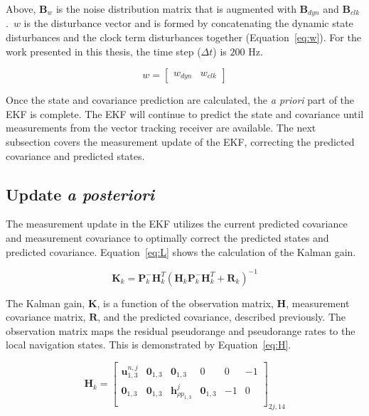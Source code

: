 Above, \(\mathbf{B}_w\) is the noise distribution matrix that is augmented with \(\mathbf{B}_{dyn}\) and \(\mathbf{B}_{clk}\).~\(w\) is the disturbance vector and is formed by concatenating the dynamic state disturbances and the clock term disturbances together (Equation~\ref{eq:w}). For the work presented in this thesis, the time step (\(\Delta t\)) is \(200\) Hz.

\begin{equation}\label{eq:w}
    w = \begin{bmatrix}
        w_{dyn} & w_{clk}
    \end{bmatrix}
\end{equation}

Once the state and covariance prediction are calculated, the \textit{a priori} part of the EKF is complete. The EKF will continue to predict the state and covariance until measurements from the vector tracking receiver are available. The next subsection covers the measurement update of the EKF, correcting the predicted covariance and predicted states.

\subsection{Update \textit{a posteriori}}
The measurement update in the EKF utilizes the current predicted covariance and measurement covariance to optimally correct the predicted states and predicted covariance. Equation~\ref{eq:L} shows the calculation of the Kalman gain.

\begin{equation}\label{eq:L}
    \mathbf{K}_k = \mathbf{P}^-_k \mathbf{H}^T_k{\left(\mathbf{H}_k\mathbf{P}^-_k\mathbf{H}^T_k + \mathbf{R}_k\right)}^{-1}
\end{equation}

The Kalman gain, \(\mathbf{K}\), is a function of the observation matrix, \(\mathbf{H}\), measurement covariance matrix, \(\mathbf{R}\), and the predicted covariance, described previously. The observation matrix maps the residual pseudorange and pseudorange rates to the local navigation states. This is demonstrated by Equation~\ref{eq:H}.

\begin{equation}\label{eq:H}
    \mathbf{H}_k = \begin{bmatrix}
        \mathbf{u}^{n,j}_{1,3} & \mathbf{0}_{1,3} & \mathbf{0}_{1,3}            & 0                & 0  & -1 \\
        \mathbf{0}_{1,3}       & \mathbf{0}_{1,3} & \mathbf{h}^j_{\rho p_{1,3}} & \mathbf{0}_{1,3} & -1 & 0  \\
    \end{bmatrix}_{2j,14}
\end{equation}

